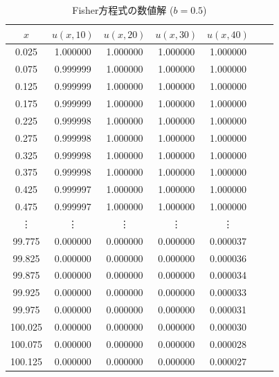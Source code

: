 \documentclass[a4j, titlepage]{jsarticle}
\numberwithin{equation}{section}
\begin{document}
            \begin{table}[h]
                \caption{Fisher方程式の数値解 ($b = 0.5$)}
                \label{tab:fisher50}
                \centering
                \begin{tabular}{ccccccc}
                    \hline
                    $x$ & $u(x, 10)$ & $u(x, 20)$ & $u(x, 30)$ & $u(x, 40)$
                    \\
                    \hline
                    \hline
                    0.025 & 1.000000 & 1.000000 & 1.000000 & 1.000000 \\
                    0.075 & 0.999999 & 1.000000 & 1.000000 & 1.000000 \\
                    0.125 & 0.999999 & 1.000000 & 1.000000 & 1.000000 \\
                    0.175 & 0.999999 & 1.000000 & 1.000000 & 1.000000 \\
                    0.225 & 0.999998 & 1.000000 & 1.000000 & 1.000000 \\
                    0.275 & 0.999998 & 1.000000 & 1.000000 & 1.000000 \\
                    0.325 & 0.999998 & 1.000000 & 1.000000 & 1.000000 \\
                    0.375 & 0.999998 & 1.000000 & 1.000000 & 1.000000 \\
                    0.425 & 0.999997 & 1.000000 & 1.000000 & 1.000000 \\
                    0.475 & 0.999997 & 1.000000 & 1.000000 & 1.000000 \\
                    \vdots & \vdots & \vdots & \vdots & \vdots \vspace{1mm} \\
                    99.775 & 0.000000 & 0.000000 & 0.000000 & 0.000037 \\
                    99.825 & 0.000000 & 0.000000 & 0.000000 & 0.000036 \\
                    99.875 & 0.000000 & 0.000000 & 0.000000 & 0.000034 \\
                    99.925 & 0.000000 & 0.000000 & 0.000000 & 0.000033 \\
                    99.975 & 0.000000 & 0.000000 & 0.000000 & 0.000031 \\
                    100.025 & 0.000000 & 0.000000 & 0.000000 & 0.000030 \\
                    100.075 & 0.000000 & 0.000000 & 0.000000 & 0.000028 \\
                    100.125 & 0.000000 & 0.000000 & 0.000000 & 0.000027 \\

\end{tabular}
\end{table}
\end{document}
